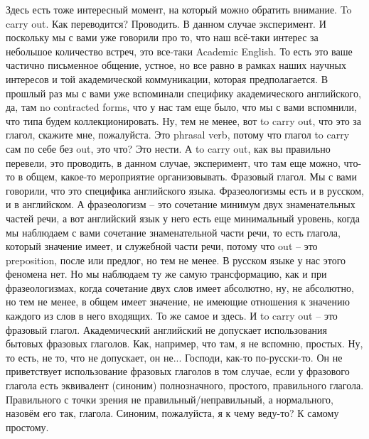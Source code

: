 \documentclass[main.tex]{subfiles}
\begin{document}
Здесь есть тоже интересный момент, на который можно обратить внимание.
To carry out.
Как переводится?
Проводить.
В данном случае эксперимент.
И поскольку мы с вами уже говорили про то, что наш всё-таки интерес за небольшое количество встреч, это все-таки Academic English.
То есть это ваше частично письменное общение, устное, но все равно в рамках наших научных интересов и той академической коммуникации, которая предполагается.
В прошлый раз мы с вами уже вспоминали специфику академического английского, да, там no contracted forms, что у нас там еще было, что мы с вами вспомнили, что типа будем коллекционировать.
Ну, тем не менее, вот to carry out, что это за глагол, скажите мне, пожалуйста.
Это phrasal verb, потому что глагол to carry сам по себе без out, это что?
Это нести.
А to carry out, как вы правильно перевели, это проводить, в данном случае, эксперимент, что там еще можно, что-то в общем, какое-то мероприятие организовывать.
Фразовый глагол.
Мы с вами говорили, что это специфика английского языка.
Фразеологизмы есть и в русском, и в английском.
А фразеологизм -- это сочетание минимум двух знаменательных частей речи, а вот английский язык у него есть еще минимальный уровень, когда мы наблюдаем с вами сочетание знаменательной части речи, то есть глагола, который значение имеет, и служебной части речи, потому что out -- это preposition, после или предлог, но тем не менее.
В русском языке у нас этого феномена нет.
Но мы наблюдаем ту же самую трансформацию, как и при фразеологизмах, когда сочетание двух слов имеет абсолютно, ну, не абсолютно, но тем не менее, в общем имеет значение, не имеющие отношения к значению каждого из слов в него входящих.
То же самое и здесь.
И to carry out -- это фразовый глагол.
Академический английский не допускает использования бытовых фразовых глаголов.
Как, например, что там, я не вспомню, простых.
Ну, то есть, не то, что не допускает, он не...
Господи, как-то по-русски-то.
Он не приветствует использование фразовых глаголов в том случае, если у фразового глагола есть эквивалент (синоним) полнозначного, простого, правильного глагола.
Правильного с точки зрения не правильный/неправильный, а нормального, назовём его так, глагола.
Синоним, пожалуйста, я к чему веду-то?
К самому простому.
\end{document}
